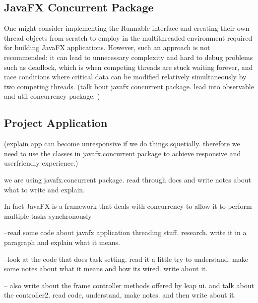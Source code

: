 \subsection{JavaFX Concurrent Package}
%
One might consider implementing the Runnable interface and creating their own thread objects from scratch to employ in the multithreaded environment required for building JavaFX applications. However, such an approach is not recommended; it can lead to unnecessary complexity and hard to debug problems such as deadlock, which is when competing threads are stuck waiting forever, and race conditions where critical data can be modified relatively simultaneously by two competing threads. 
(talk bout javafx concurrent package. lead into observable and util concurrency package. )


\subsection{Project Application}
%













 (explain app can become unresponsive if we do things squetially. therefore we need to use the classes in javafx.concurrent package to achieve responsive and userfriendly experience.)



we are using javafx.concurrent package. read through docs and write notes about what to write and explain. 



In fact JavaFX is a framework that deals with concurrency to allow it to perform multiple tasks synchronously 





--read some code about javafx application threading stuff. research. 
write it in a paragraph and explain what it means. 

--look at the code that does task setting. read it a little try to understand. make some notes about what it means and how its wired. 
write about it. 

-- also write about the frame controller methods offered by leap ui. and talk about the controller2. read code, understand, make notes. and then write about it. 